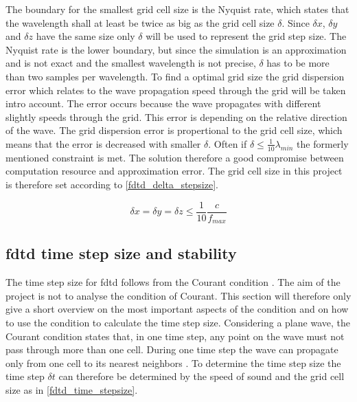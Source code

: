 The boundary for the smallest grid cell size is the Nyquist rate, which states that the wavelength shall at least be twice as big as the grid cell size $\delta$. Since $\delta x$, $\delta y$ and $\delta z$ have the same size only $\delta$ will be used to represent the grid step size. The Nyquist rate is the lower boundary, but since the simulation is an approximation and is not exact and the smallest wavelength is not precise, $\delta$ has to be more than two samples per wavelength. To find a optimal grid size the grid dispersion error which relates to the wave propagation speed through the grid will be taken intro account. The error occurs because the wave propagates with different slightly speeds through the grid. This error is depending on the relative direction of the wave. The grid dispersion error is propertional to the grid cell size, which means that the error is decreased with smaller $\delta$\citep{Kunz1993}. 
Often if $ \delta \leq \frac{1}{10}\lambda_{min}$ the formerly mentioned constraint is met. The solution therefore a good compromise between computation resource and approximation error. The grid cell size in this project is therefore set according to \autoref{fdtd_delta_stepsize}.

\begin{equation}\label{fdtd_delta_stepsize}
\delta x = \delta y = \delta z \leq \frac{1}{10} \frac{c}{f_{max}}
\end{equation}

    \startexplain
    \stopexplain
    
    
    

\subsection{\gls{fdtd} time step size and stability}   \label{sec:fdtd_time_stepsize} 
The time step size for \gls{fdtd} follows from the Courant condition \citep{Kunz1993}. The aim of the project is not to analyse the condition of Courant. This section will therefore only give a short overview on the most important aspects of the condition and on how to use the condition to calculate the time step size. Considering a plane wave, the Courant condition states that, in one time step, any point on the wave must not pass through more than one cell. During one time step the wave can propagate only from one cell to its nearest neighbors \citep{Kunz1993}. To determine the time step size the time step $\delta t $ can therefore be determined by the speed of sound and the grid cell size as in \autoref{fdtd_time_stepsize}.



